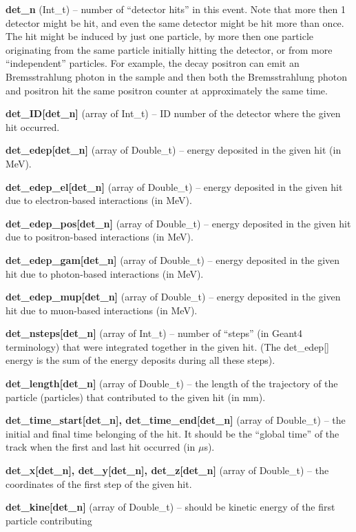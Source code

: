 \documentclass[twoside]{dis04}
\begin{document}
\begin{description}
\item{\bf det\_n} (Int\_t) -- number of ``detector hits'' in this event.  Note that more then 1 detector
        might be hit, and even the same detector might be hit more than once.  The hit might be induced by just one
        particle, by more then one particle originating from the same particle initially hitting the detector, 
	or from more ``independent'' particles.
    	For example, the decay positron can emit an Bremsstrahlung photon in the sample and then both the Bremsstrahlung
	photon and positron hit the same positron counter at approximately the same time.
\item{\bf det\_ID[det\_n]} (array of Int\_t) -- ID number of the detector where the given hit occurred.
\item{\bf det\_edep[det\_n]} (array of Double\_t) -- energy deposited in the given hit (in MeV).
\item{\bf det\_edep\_el[det\_n]} (array of  Double\_t) -- energy deposited in the given hit due to electron-based interactions (in MeV).
\item{\bf det\_edep\_pos[det\_n]} (array of Double\_t) -- energy deposited in the given hit due to positron-based interactions (in MeV).
\item{\bf det\_edep\_gam[det\_n]} (array of Double\_t) -- energy deposited in the given hit due to photon-based interactions (in MeV).
\item{\bf det\_edep\_mup[det\_n]} (array of Double\_t) -- energy deposited in the given hit due to muon-based interactions (in MeV).
\item{\bf det\_nsteps[det\_n]} (array of Int\_t) -- number of ``steps'' (in {\sc Geant4} terminology) that were 
	integrated together in the given hit. (The det\_edep[] energy is the sum of the energy deposits during all these steps).
\item{\bf det\_length[det\_n]} (array of Double\_t) -- the length of the trajectory of the particle (particles) that contributed to
        the given hit (in mm).
\item{\bf det\_time\_start[det\_n], det\_time\_end[det\_n]} (array of Double\_t) -- the initial and final time belonging of the hit.
	It should be the ``global time'' of the track when the first and last hit occurred (in $\mu$s).
\item{\bf det\_x[det\_n], det\_y[det\_n], det\_z[det\_n]} (array of Double\_t) -- the coordinates of the first step of the given hit.
\item{\bf det\_kine[det\_n]} (array of Double\_t) -- should be kinetic energy of the first particle contributing 

\end{description}
\end{document}
